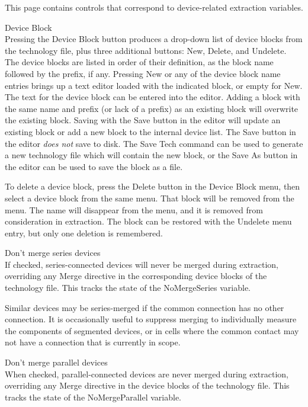 This page contains controls that correspond to device-related
extraction variables.

\begin{description}
\item{\cb Device Block}\\
Pressing the {\cb Device Block} button produces a drop-down list of
device blocks from the technology file, plus three additional buttons: 
{\cb New}, {\cb Delete}, and {\cb Undelete}.  The device blocks are
listed in order of their definition, as the block name followed by the
prefix, if any.  Pressing {\cb New} or any of the device block name
entries brings up a text editor loaded with the indicated block, or
empty for {\cb New}.  The text for the device block can be entered
into the editor.  Adding a block with the same name and prefix (or
lack of a prefix) as an existing block will overwrite the existing
block.  Saving with the {\cb Save} button in the editor will update an
existing block or add a new block to the internal device list.  The
{\cb Save} button in the editor {\it does not} save to disk.  The {\cb
Save Tech} command can be used to generate a new technology file which
will contain the new block, or the {\cb Save As} button in the editor
can be used to save the block as a file.

To delete a device block, press the {\cb Delete} button in the {\cb
Device Block} menu, then select a device block from the same menu. 
That block will be removed from the menu.  The name will disappear
from the menu, and it is removed from consideration in extraction. 
The block can be restored with the {\cb Undelete} menu entry, but only
one deletion is remembered.

\item{\cb Don't merge series devices}\\
If checked, series-connected devices will never be merged during
extraction, overriding any {\vt Merge} directive in the corresponding
device blocks of the technology file.  This tracks the state of the
{\et NoMergeSeries} variable.

Similar devices may be series-merged if the common connection has no
other connection.  It is occasionally useful to suppress merging to
individually measure the components of segmented devices, or in cells
where the common contact may not have a connection that is currently
in scope.

\item{\cb Don't merge parallel devices}\\
When checked, parallel-connected devices are never merged during
extraction, overriding any {\vt Merge} directive in the device blocks
of the technology file.  This tracks the state of the {\et
NoMergeParallel} variable.


\end{description}
